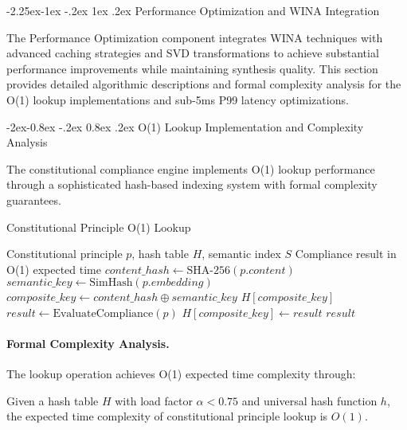 \documentclass[manuscript,screen,9pt]{acmart}
\makeatletter
\renewcommand\subsection{\@startsection{subsection}{2}{\z@}%
  {-2.25ex\@plus -1ex \@minus -.2ex}%
  {1ex \@plus .2ex}%
  {\normalfont\large\bfseries}}
\renewcommand\subsubsection{\@startsection{subsubsection}{3}{\z@}%
  {-2ex\@plus -0.8ex \@minus -.2ex}%
  {0.8ex \@plus .2ex}%
  {\normalfont\normalsize\bfseries}}
\makeatother
\begin{document}
\subsection{Performance Optimization and WINA Integration}
\label{subsec:performance_optimization}

The Performance Optimization component integrates WINA techniques with advanced caching strategies and SVD transformations to achieve substantial performance improvements while maintaining synthesis quality. This section provides detailed algorithmic descriptions and formal complexity analysis for the O(1) lookup implementations and sub-5ms P99 latency optimizations.

\subsubsection{O(1) Lookup Implementation and Complexity Analysis}

The constitutional compliance engine implements O(1) lookup performance through a sophisticated hash-based indexing system with formal complexity guarantees.

\begin{algorithm}[H]
\caption{Constitutional Principle O(1) Lookup}
\label{alg:constitutional_lookup}
\begin{algorithmic}[1]
\Require Constitutional principle $p$, hash table $H$, semantic index $S$
\Ensure Compliance result in O(1) expected time
\State $content\_hash \leftarrow \text{SHA-256}(p.content)$
\State $semantic\_key \leftarrow \text{SimHash}(p.embedding)$ 
\State $composite\_key \leftarrow content\_hash \oplus semantic\_key$
    \State \Return $H[composite\_key]$
\Else
    \State $result \leftarrow \text{EvaluateCompliance}(p)$
    \State $H[composite\_key] \leftarrow result$
    \State \Return $result$
\EndIf
\end{algorithmic}
\end{algorithm}

\paragraph{Formal Complexity Analysis.} The lookup operation achieves O(1) expected time complexity through:

\begin{theorem}
Given a hash table $H$ with load factor $\alpha < 0.75$ and universal hash function $h$, the expected time complexity of constitutional principle lookup is $O(1)$.
\end{theorem}
\end{document}
